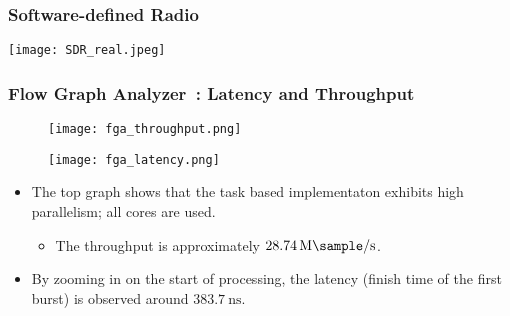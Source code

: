 \begin{frame}
  \end{frame}


  \begin{frame}
    \frametitle{Software-defined Radio}
    \begin{center}
      \texttt{[image: SDR\_real.jpeg]}
    \end{center}

  \end{frame} 


  \begin{frame}
    \frametitle{Flow Graph Analyzer~\cite{Intel_Corporation}: Latency and Throughput}


    \begin{figure}
        \centering
          \texttt{[image: fga\_throughput.png]}
    \end{figure}

    \begin{figure}
      \centering
        \texttt{[image: fga\_latency.png]}
  \end{figure}

    \begin{itemize}
        \item The top graph shows that the task based implementaton
          exhibits high parallelism; all cores are used.
          \begin{itemize}
          \item The throughput is approximately
            $ \SI[per-mode=symbol]{28.74}{\mega\sample\per\second}$.
          \end{itemize}
        \item By zooming in on the start of processing, the latency (finish time of the first burst) is observed around $ \SI[per-mode=symbol]{383.7}{\nano\second}$.

    \end{itemize}
  \end{frame}


